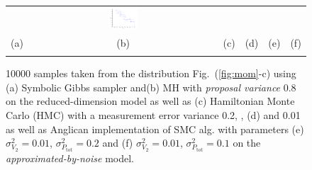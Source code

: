 \documentclass[]{article}
\newcommand{\nn}{0.16}
\begin{document}
\begin{figure}[t!]
\begin{center}
\begin{tabular}{cccccc}
& \hspace{-3mm} \includegraphics[width=\nn\textwidth]{Figs2/col_c_ang_10000_01_001}
\vspace{-1.5mm}
\\
   \hspace{-4mm} \footnotesize(a) 
& \hspace{-2mm} \footnotesize(b) 
& \hspace{-3mm} \footnotesize(c) 
&\hspace{-1mm} \footnotesize(d) 
&\hspace{-1mm} \footnotesize(e) 
&\hspace{-1mm} \footnotesize(f)\\
\multicolumn{6}{c}{}
\end{tabular}
\end{center}
\vspace{-8mm}
\caption{\footnotesize
10000 samples taken from the distribution Fig.~(\ref{fig:mom}-c)
using (a) Symbolic Gibbs sampler and(b) MH with \emph{proposal variance} 0.8 
on the reduced-dimension model as well as  
(c) Hamiltonian Monte Carlo (HMC) with a measurement error variance 0.2, 
, (d) and 0.01 as well as Anglican implementation of SMC alg. with %
parameters (e)
$\sigma^2_{V_2} = 0.01$, $\sigma^2_{P_\text{tot}} = 0.2$ and 
(f) $\sigma^2_{V_2} = 0.01$, $\sigma^2_{P_\text{tot}} = 0.1$
on the \emph{approximated-by-noise} model.
}
\label{fig:mom2}
\vspace{-4mm}
\end{figure}
\end{document}
